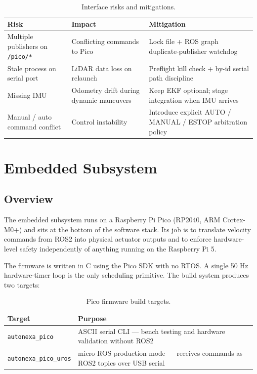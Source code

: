 \documentclass[12pt,a4paper]{report}
\begin{document}
\begin{table}[H]
\centering
\caption{Interface risks and mitigations.}
\label{tab:risks}
\begin{tabularx}{\textwidth}{|p{3.5cm}|X|X|}
\hline
\textbf{Risk} & \textbf{Impact} & \textbf{Mitigation} \\
\hline
Multiple publishers on \texttt{/pico/*} & Conflicting commands to Pico & Lock file + ROS graph duplicate-publisher watchdog \\
\hline
Stale process on serial port & LiDAR data loss on relaunch & Preflight kill check + by-id serial path discipline \\
\hline
Missing IMU & Odometry drift during dynamic maneuvers & Keep EKF optional; stage integration when IMU arrives \\
\hline
Manual / auto command conflict & Control instability & Introduce explicit AUTO / MANUAL / ESTOP arbitration policy \\
\hline
\end{tabularx}
\end{table}

\chapter{Embedded Subsystem}

\section{Overview}

The embedded subsystem runs on a Raspberry Pi Pico (RP2040, ARM Cortex-M0+) and sits at the bottom of the software stack. Its job is to translate velocity commands from ROS2 into physical actuator outputs and to enforce hardware-level safety independently of anything running on the Raspberry Pi 5.

The firmware is written in C using the Pico SDK with no RTOS. A single 50 Hz hardware-timer loop is the only scheduling primitive. The build system produces two targets:

\begin{table}[H]
\centering
\caption{Pico firmware build targets.}
\label{tab:pico_builds}
\begin{tabularx}{\textwidth}{|p{4.5cm}|X|}
\hline
\textbf{Target} & \textbf{Purpose} \\
\hline
\texttt{autonexa\_pico} & ASCII serial CLI --- bench testing and hardware validation without ROS2 \\
\hline
\texttt{autonexa\_pico\_uros} & micro-ROS production mode --- receives commands as ROS2 topics over USB serial \\
\hline
\end{tabularx}
\end{table}
\end{document}
